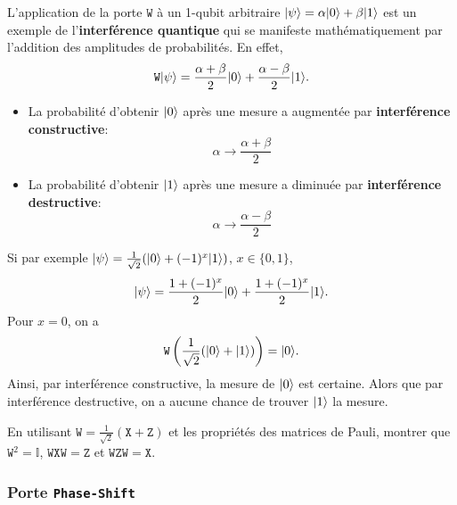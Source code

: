 \begin{remark}
 L'application de la porte $\mathtt{W}$ à un 1-qubit arbitraire
$\vert\psi\rangle=\alpha\vert0\rangle+\beta\vert1\rangle$ est un exemple de l'\textbf{interférence
quantique} qui se manifeste mathématiquement par l'addition des amplitudes de
probabilités. En effet,
\begin{equation}
\mathtt{W}\vert\psi\rangle=\frac{\alpha+\beta}{2}\vert0\rangle+\frac{\alpha-\beta}{2}\vert1\rangle
.
\end{equation}

\begin{itemize}
 \item La probabilité d'obtenir $\vert0\rangle$ après une mesure a augmentée par
\textbf{interférence constructive}:
\begin{equation}
 \alpha\rightarrow\frac{\alpha+\beta}{2}
\end{equation}
\item La probabilité d'obtenir $\vert1\rangle$ après une mesure a diminuée par
\textbf{interférence destructive}:
\begin{equation}
 \alpha\rightarrow\frac{\alpha-\beta}{2}
\end{equation}
\end{itemize}
Si par exemple $\vert\psi\rangle=\frac{1}{\sqrt{2}}(\vert0\rangle+(-1)^x\vert1\rangle)$,
$x\in\{0,1\}$,
\begin{equation}
\vert\psi\rangle=\frac{1+(-1)^x}{2}\vert0\rangle+\frac{1+(-1)^x}{2}\vert1\rangle.
\end{equation}
Pour $x=0$, on a
\begin{equation}
 \mathtt{W}\left(\frac{1}{\sqrt{2}}(\vert0\rangle+\vert1\rangle)\right)=\vert0\rangle.
\end{equation}
Ainsi, par interférence constructive, la mesure de $\vert0\rangle$ est certaine.
Alors que par interférence destructive, on a aucune chance de trouver $\vert1\rangle$
la mesure.
\end{remark}

\begin{exercise}
 En utilisant $\mathtt{W}=\frac{1}{\sqrt{2}}(\mathtt{X}+\mathtt{Z})$ et les
propriétés des matrices de Pauli, montrer que  $\mathtt{W}^2=\mathbb{I}$,
$\mathtt{W}\mathtt{X}\mathtt{W}=\mathtt{Z}$ et
$\mathtt{W}\mathtt{Z}\mathtt{W}=\mathtt{X}$.
\end{exercise}


\subsubsection{Porte \texttt{Phase-Shift}}

